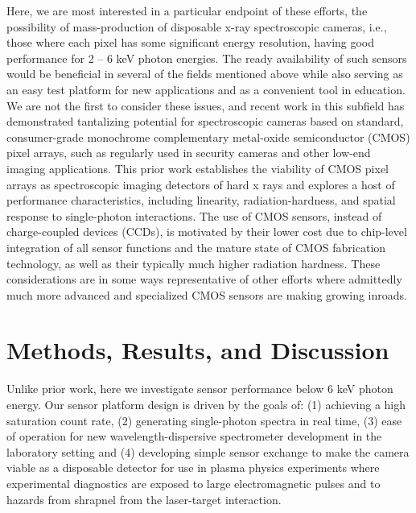 Here, we are most interested in a particular endpoint of these efforts,
the possibility of mass-production of disposable x-ray spectroscopic
cameras, i.e., those where each pixel has some significant energy
resolution, having good performance for 2 -- 6 keV photon energies. The
ready availability of such sensors would be beneficial in several of the
fields mentioned above while also serving as an easy test platform for
new applications and as a convenient tool in education. We are not the
first to consider these issues, and recent work in this subfield has
demonstrated tantalizing potential for spectroscopic cameras based on
standard, consumer-grade monochrome complementary metal-oxide
semiconductor (CMOS) pixel
arrays, \cite{SERVOLI2010CHARACTERIZATION, LANE2012X} such as
regularly used in security cameras and other low-end imaging
applications. This prior work establishes the viability of CMOS pixel
arrays as spectroscopic imaging detectors of hard x rays and explores a
host of performance characteristics, including linearity,
radiation-hardness, and spatial response to single-photon interactions.
The use of CMOS sensors, instead of charge-coupled devices (CCDs), is
motivated by their lower cost due to chip-level integration of all
sensor functions and the mature state of CMOS fabrication technology, as
well as their typically much higher radiation
hardness\emph{.} These
considerations are in some ways representative of other efforts where
admittedly much more advanced and specialized CMOS sensors are making
growing inroads. 

\section{Methods, Results, and Discussion}
Unlike prior work, here we investigate sensor performance below 6 keV
photon energy. Our sensor platform design is driven by the goals of: (1)
achieving a high saturation count rate, (2) generating single-photon
spectra in real time, (3) ease of operation for new
wavelength-dispersive spectrometer development in the laboratory
setting \cite{SEIDLER2014LABORATORY} and (4)
developing simple sensor exchange to make the camera viable as a
disposable detector for use in plasma physics experiments where
experimental diagnostics are exposed to large electromagnetic pulses and
to hazards from shrapnel from the laser-target interaction.

